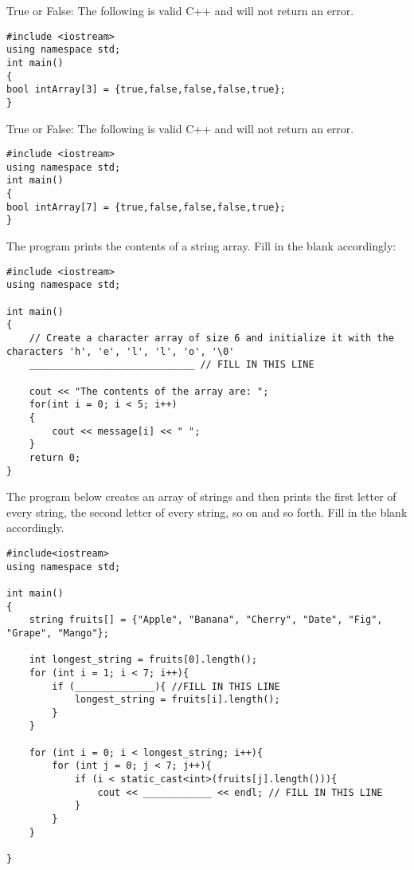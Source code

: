 \begin{problem}
    True or False: The following is valid C++ and will not return an error.
\begin{verbatim}
#include <iostream>
using namespace std;
int main()
{
bool intArray[3] = {true,false,false,false,true};
}
\end{verbatim}
\end{problem}

\begin{problem}
    True or False: The following is valid C++ and will not return an error.
\begin{verbatim}
#include <iostream>
using namespace std;
int main()
{
bool intArray[7] = {true,false,false,false,true};
}
\end{verbatim}
\end{problem}

\begin{problem}
    The program prints the contents of a string array. Fill in the blank accordingly:

    \begin{verbatim}
#include <iostream>
using namespace std;

int main()
{
    // Create a character array of size 6 and initialize it with the characters 'h', 'e', 'l', 'l', 'o', '\0'
    _____________________________ // FILL IN THIS LINE

    cout << "The contents of the array are: ";
    for(int i = 0; i < 5; i++)
    {
        cout << message[i] << " ";
    }
    return 0; 
}

\end{verbatim}
\end{problem}

\begin{problem}
The program below creates an array of strings and then prints the first letter of every string, the second letter of every string, so on and so forth. Fill in the blank accordingly.

\begin{verbatim}
#include<iostream>
using namespace std;

int main()
{
    string fruits[] = {"Apple", "Banana", "Cherry", "Date", "Fig", "Grape", "Mango"};

    int longest_string = fruits[0].length();
    for (int i = 1; i < 7; i++){
        if (______________){ //FILL IN THIS LINE
            longest_string = fruits[i].length();
        }
    }

    for (int i = 0; i < longest_string; i++){
        for (int j = 0; j < 7; j++){ 
            if (i < static_cast<int>(fruits[j].length())){
                cout << ____________ << endl; // FILL IN THIS LINE
            }
        }
    }

}

\end{verbatim}
\end{problem}

